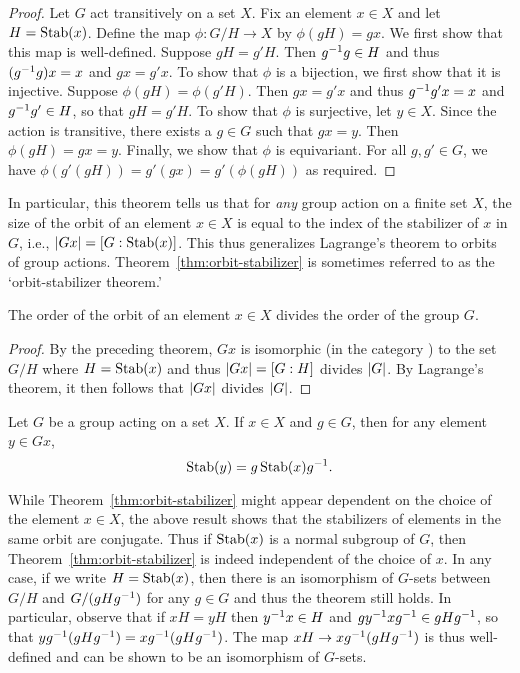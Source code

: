 \begin{proof}
    Let \(G\) act transitively on a set \(X\). Fix an element \(x \in X\) and
    let \(H = \operatorname{Stab}(x)\). Define the map \(\phi: G/H \to X\) by \(\phi(gH) =
    gx\). We first show that this map is well-defined. Suppose \(gH = g'H\).
    Then \(g^{-1} g \in H\) and thus \((g^{-1} g)x = x\) and \(gx = g'x\). To show
    that \(\phi\) is a bijection, we first show that it is injective. Suppose
    \(\phi(gH) = \phi(g'H)\). Then \(gx = g'x\) and thus \(g^{-1} g'x = x\) and
    \(g^{-1} g' \in H\), so that \(gH = g'H\). To show that \(\phi\) is
    surjective, let \(y \in X\). Since the action is transitive, there exists a
    \(g \in G\) such that \(gx = y\). Then \(\phi(gH) = gx = y\). Finally, we
    show that \(\phi\) is equivariant. For all \(g, g' \in G\), we have
    \(\phi(g'(gH)) = g'(gx) = g'(\phi(gH))\) as required.
\end{proof}

In particular, this theorem tells us that for \emph{any} group action on a
finite set \(X\), the size of the orbit of an element \(x \in X\) is equal to
the index of the stabilizer of \(x\) in \(G\), i.e., \(\lvert Gx \rvert = [G :
\operatorname{Stab}(x)]\). This thus generalizes Lagrange's theorem to orbits of group
actions. Theorem~\ref{thm:orbit-stabilizer} is sometimes referred to as the
`orbit-stabilizer theorem.'

\begin{corollary}
    The order of the orbit of an element \(x \in X\) divides the order of the
    group \(G\).
\end{corollary}

\begin{proof}
    By the preceding theorem, \(Gx\) is isomorphic (in the category \Gset) to
    the set \(G/H\) where \(H = \operatorname{Stab}(x)\) and thus \(\lvert Gx \rvert = [G : H]\)
    divides \(\lvert G \rvert\). By Lagrange's theorem, it then follows that
    \(\lvert Gx \rvert\) divides \(\lvert G \rvert\).
\end{proof}

\begin{theorem}
    \label{thm:stabilizers-conjugate}
    Let \(G\) be a group acting on a set \(X\). If \(x \in X\) and \(g \in G\),
    then for any element \(y \in Gx\),
    \[
        \operatorname{Stab}(y) = g\operatorname{Stab}(x)g^{-1}.
    \]
\end{theorem}

While Theorem~\ref{thm:orbit-stabilizer} might appear dependent on the choice of
the element \(x \in X\), the above result shows that the stabilizers of elements
in the same orbit are conjugate. Thus if \(\operatorname{Stab}(x)\) is a normal subgroup of
\(G\), then Theorem~\ref{thm:orbit-stabilizer} is indeed independent of the
choice of \(x\). In any case, if we write \(H = \operatorname{Stab}(x)\), then there is an
isomorphism of \(G\)-sets between \(G/H\) and \(G/(gHg^{-1})\) for any \(g \in
G\) and thus the theorem still holds. In particular, observe that if \(xH = yH\)
then \(y^{-1} x \in H\) and \(gy^{-1} xg^{-1} \in gHg^{-1}\), so that
\(yg^{-1}(gHg^{-1}) = xg^{-1}(gHg^{-1})\). The map \(xH \to xg^{-1}(gHg^{-1})\) is
thus well-defined and can be shown to be an isomorphism of \(G\)-sets. 

